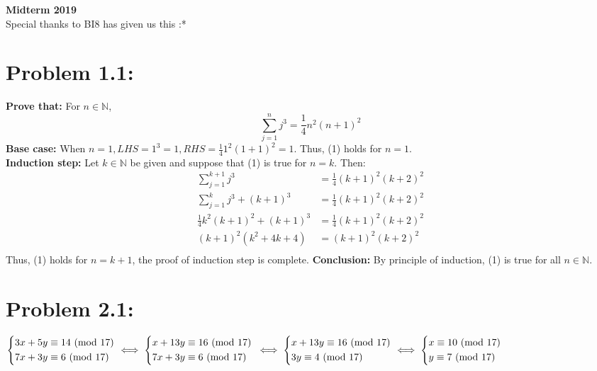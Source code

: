 \documentclass{article}
\newcommand{\N}{\mathbb{N}}
\begin{document}
	\centering
	\LARGE\textbf{Midterm 2019}\\
	\Large Special thanks to BI8 has given us this :* 
	
	\justify
	
	\section{Problem 1.1:}
		\textbf{Prove that:} For $n \in \N$,
			\begin{equation}
				\sum_{j=1}^{n} j^3 = \frac{1}{4}n^2(n+1)^2
			\end{equation}
		\textbf{Base case:} When $n = 1, LHS = 1^3 = 1, RHS = \frac{1}{4}1^2(1+1)^2 = 1$. Thus, (1) holds for $n=1$.\\
		\textbf{Induction step:} Let $k \in \N$ be given and suppose that (1) is true for $n=k$. Then:\\
		\begin{align*}
			\sum_{j=1}^{k+1} j^3 &= \frac{1}{4}(k+1)^2(k+2)^2\\
			\sum_{j=1}^{k} j^3 + (k+1)^3 &= \frac{1}{4}(k+1)^2(k+2)^2\\
			\frac{1}{4}k^2(k+1)^2 + (k+1)^3 &= \frac{1}{4}(k+1)^2(k+2)^2\\
			(k+1)^2(k^2 + 4k + 4) &= (k+1)^2(k+2)^2\\
		\end{align*}
		Thus, (1) holds for $n=k+1$, the proof of induction step is complete.
		\textbf{Conclusion:} By principle of induction, (1) is true for all $n \in \N$.
	
	\section{Problem 2.1:}
		\begin{math}
			\begin{cases*}
				3x + 5y \equiv 14 \mbox{ (mod 17)}\\
				7x + 3y \equiv 6 \mbox{ (mod 17)}
			\end{cases*}
			\iff
			\begin{cases*}
				x + 13y \equiv 16 \mbox{ (mod 17)}\\
				7x + 3y \equiv 6 \mbox{ (mod 17)}
			\end{cases*}
			\\\\\\
			\iff
			\begin{cases*}
				x + 13y \equiv 16 \mbox{ (mod 17)}\\
				3y \equiv 4 \mbox{ (mod 17)}
			\end{cases*}
			\iff
			\begin{cases*}
				x \equiv 10 \mbox{ (mod 17)}\\
				y \equiv 7 \mbox{ (mod 17)}
			\end{cases*}
		\end{math}
		
\end{document}
